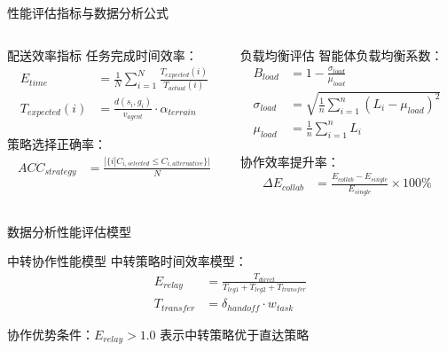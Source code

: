 \documentclass[
10pt,
aspectratio=169,
]{beamer}
\begin{document}
\begin{frame}{性能评估指标与数据分析公式}
    \begin{columns}
        \begin{column}{0.5\textwidth}
            \begin{exampleblock}{配送效率指标}
                任务完成时间效率：
                \begin{align}
                E_{time} &= \frac{1}{N} \sum_{i=1}^{N} \frac{T_{expected}(i)}{T_{actual}(i)} \\
                T_{expected}(i) &= \frac{d(s_i, g_i)}{v_{agent}} \cdot \alpha_{terrain}
                \end{align}
                
                策略选择正确率：
                \begin{align}
                ACC_{strategy} &= \frac{|\{i | C_{i,selected} \leq C_{i,alternative}\}|}{N} \\
                \end{align}
            \end{exampleblock}
        \end{column}
        \begin{column}{0.5\textwidth}
            \begin{alertblock}{负载均衡评估}
                智能体负载均衡系数：
                \begin{align}
                B_{load} &= 1 - \frac{\sigma_{load}}{\mu_{load}} \\
                \sigma_{load} &= \sqrt{\frac{1}{n} \sum_{i=1}^{n} (L_i - \mu_{load})^2} \\
                \mu_{load} &= \frac{1}{n} \sum_{i=1}^{n} L_i
                \end{align}
                
                协作效率提升率：
                \begin{align}
                \Delta E_{collab} &= \frac{E_{collab} - E_{single}}{E_{single}} \times 100\%
                \end{align}
            \end{alertblock}
        \end{column}
    \end{columns}
    \end{frame}

    \begin{frame}{数据分析性能评估模型}
        \begin{block}{中转协作性能模型}
            中转策略时间效率模型：
            \begin{align}
            E_{relay} &= \frac{T_{direct}}{T_{leg1} + T_{leg2} + T_{transfer}} \\
            T_{transfer} &= \delta_{handoff} \cdot w_{task}
            \end{align}
            
            协作优势条件：$E_{relay} > 1.0$ 表示中转策略优于直达策略
        \end{block}
    \end{frame}
\end{document}
